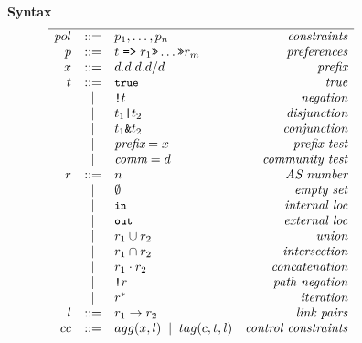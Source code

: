 \documentclass[10pt]{sigalternate052015} %
\newcommand{\CD}[1]{\texttt{\small #1}}  %
\newcommand{\KW}[1]{\texttt{\small\bfseries{#1}}}
\newcommand{\True}{\CD{true}}
\newcommand{\Prefer}{\texttt{>>}}
\newcommand{\Path}{\texttt{=>}}
\newcommand{\In}{\KW{in}}
\newcommand{\Out}{\KW{out}}
\newcommand{\AND}{\texttt{\&}}
\newcommand{\OR}{\texttt{|}}
\newcommand{\NOT}{\texttt{!}}
\providecommand{\DIFaddbegin}{} %
\begin{document}
\DIFaddbegin \newcommand{\BNFALT}{\;\;|\;\;}
\newcommand{\hdr}[2]{\flushleft \chdr{\hspace{5mm}#1}{#2}}
\newcommand{\chdr}[2]{\textbf{#1} {#2} \\ \centering}

\begin{figure}[t]\small
  \begin{minipage}[t]{.45\linewidth}
  \hdr{Syntax}{}
  \vspace*{-1\baselineskip}
  \[ \begin{array}{rclr}
    \hline

     pol     &::=& p_1, \dots, p_n & \textit{constraints} \\
     p       &::=& t \hspace{.3em} \Path \hspace{.3em} r_1 \Prefer \dots \Prefer r_m & \textit{preferences} \\
     x       &::=& d.d.d.d/d & \textit{prefix} \\
     t       &::=& \True & \textit{true} \\
         &\BNFALT& \NOT t & \textit{negation} \\
         &\BNFALT& t_1 \OR{} t_2 & \textit{disjunction} \\
         &\BNFALT& t_1 \AND{} t_2 & \textit{conjunction} \\
         &\BNFALT& \textit{prefix} = x & \textit{prefix test} \\
         &\BNFALT& \textit{comm} = d & \textit{community test} \\
     r       &::=& n & \textit{AS number} \\
         &\BNFALT& \emptyset & \textit{empty set} \\
         &\BNFALT& \In & \textit{internal loc} \\
         &\BNFALT& \Out & \textit{external loc} \\
         &\BNFALT& r_1 \cup r_2 & \textit{union} \\
         &\BNFALT& r_1 \cap r_2 & \textit{intersection} \\
         &\BNFALT& r_1 \cdot r_2 & \textit{concatenation} \\
         &\BNFALT& \NOT r & \textit{path negation} \\
         &\BNFALT& r^* & \textit{iteration} \\
     l       &::=& r_1 \rightarrow r_2 & \textit{link pairs} \\
     cc     &::=& agg(x, l) \BNFALT tag(c, t, l) & \textit{control constraints} \\
  \end{array} \]


\end{minipage}
\end{figure}
\end{document}
